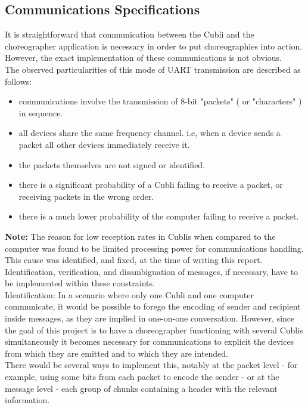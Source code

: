 \subsection{Communications Specifications}

It is straightforward that communication between the Cubli and the choreographer application is necessary in order to put choreographies into action. However, the exact implementation of these communications is not obvious.\\

The observed particularities of this mode of UART transmission are described as follows:
\begin{itemize}
\item communications involve the transmission of 8-bit "packets" ( or "characters" ) in sequence.
\item all devices share the same frequency channel. i.e, when a device sends a packet all other devices immediately receive it.
\item the packets themselves are not signed or identified.
\item there is a significant probability of a Cubli failing to receive a packet, or receiving packets in the wrong order.
\item there is a much lower probability of the computer failing to receive a packet.
\end{itemize}

\textbf{Note:} The reason for low reception rates in Cublis when compared to the computer was found to be limited processing power for communications handling. This cause was identified, and fixed, at the time of writing this report.\\

Identification, verification, and disambiguation of messages, if necessary, have to be implemented within these constraints.\\

Identification: In a scenario where only one Cubli and one computer communicate, it would be possible to forego the encoding of sender and recipient inside messages, as they are implied in one-on-one conversation. However, since the goal of this project is to have a choreographer functioning with several Cublis simultaneously it becomes necessary for communications to explicit the devices from which they are emitted and to which they are intended.\\

There would be several ways to implement this, notably at the packet level - for example, using some bits from each packet to encode the sender - or at the message level - each group of chunks containing a header with the relevant information.\\

